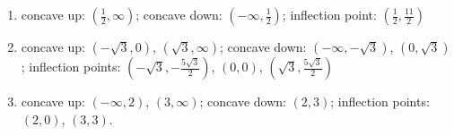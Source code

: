 \documentclass{ximera}
\begin{document}
\begin{enumerate}
\setcounter{enumi}{\value{HW}}


\item  concave up: $\left(\frac{1}{2}, \infty\right)$;  concave down: $\left( - \infty, \frac{1}{2} \right)$; inflection point:  $\left(\frac{1}{2}, \frac{11}{2}\right)$

\smallskip

\item concave up:  $\left( -\sqrt{3}, 0 \right)$, $\left( \sqrt{3}, \infty \right)$;  concave down:    $\left(- \infty,  -\sqrt{3} \right)$, $\left(0,  \sqrt{3} \right)$;  inflection points:  $\left( -\sqrt{3}, -\frac{5 \sqrt{3}}{2} \right)$, $(0,0)$, $\left( \sqrt{3}, \frac{5 \sqrt{3}}{2} \right)$
\smallskip

\item  concave up:  $(-\infty, 2)$, $(3, \infty)$;  concave down:  $(2,3)$;  inflection points: $(2,0)$, $(3, 3)$. 

\smallskip

\setcounter{HW}{\value{enumi}}
\end{enumerate}
\end{document}
